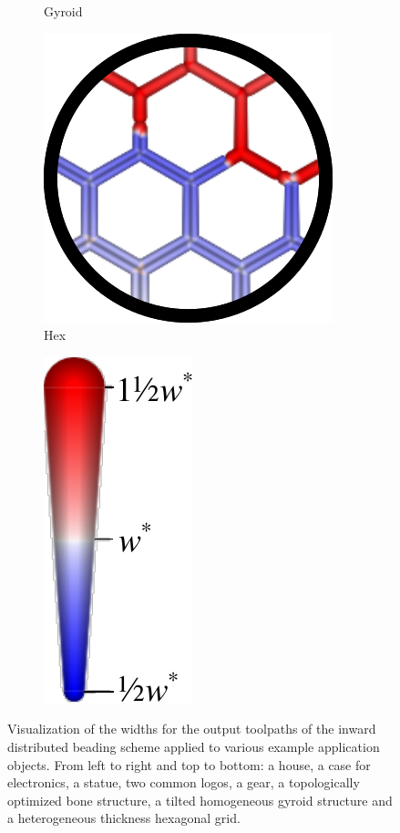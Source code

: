 \begin{figure}
\begin{subfigure}[t]{\figwidth}
\caption{Gyroid}\label{applications_gyroid}
\end{subfigure}
\begin{subfigure}[t]{\figwidth}\centering
\includegraphics[height=\figheight]{sources-applications-hex-grid.png}
\caption{Hex}\label{applications_hex}
\end{subfigure}
\begin{subfigure}[t]{.3\figwidth}
\includegraphics[height=\figheight]{sources-validation-widths-legend-small.pdf}
\end{subfigure}
\caption{
Visualization of the widths for the output toolpaths of the inward distributed beading scheme applied to various example application objects.
From left to right and top to bottom: a house, a case for electronics, a statue, two common logos, a gear, a topologically optimized bone structure, a tilted homogeneous gyroid structure and a heterogeneous thickness hexagonal grid.
}
\label{applications_overview}
\end{figure}




